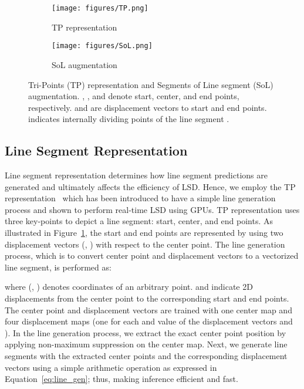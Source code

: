 \documentclass[letterpaper]{article} \usepackage{aaai22}  \usepackage{times}  \usepackage{helvet}  \usepackage{courier}  \usepackage[hyphens]{url}  \usepackage{graphicx} \urlstyle{rm} \def\UrlFont{\rm}  \usepackage{natbib}  \usepackage{caption} \DeclareCaptionStyle{ruled}{labelfont=normalfont,labelsep=colon,strut=off} \frenchspacing  \setlength{\pdfpagewidth}{8.5in}  \setlength{\pdfpageheight}{11in}  \usepackage{algorithm}
\begin{document}
\begin{figure}[t!]
    \centering
     \begin{subfigure}[b]{0.48\columnwidth}
        \centering\texttt{[image: figures/TP.png]}
         \caption{TP representation}
         \label{fig:tp}
     \end{subfigure}
    \begin{subfigure}[b]{0.48\columnwidth}
        \centering\texttt{[image: figures/SoL.png]}
         \caption{SoL augmentation}
         \label{fig:sol}
     \end{subfigure}
\caption{Tri-Points (TP) representation and Segments of Line segment (SoL) augmentation. , , and  denote start, center, and end points, respectively.  and  are displacement vectors to start and end points.  indicates internally dividing points of the line segment .}
\label{fig:line_representation}
\end{figure}

\subsection{Line Segment Representation}
Line segment representation determines how line segment predictions are generated and ultimately affects the efficiency of LSD.
Hence, we employ the TP representation~\cite{huang2020tp} which has been introduced to have a simple line generation process and shown to perform real-time LSD using GPUs.
TP representation uses three key-points to depict a line segment: start, center, and end points.
As illustrated in Figure~\ref{fig:tp}, the start  and end  points are represented by using two displacement vectors (, ) with respect to the center  point.
The line generation process, which is to convert center point and displacement vectors to a vectorized line segment, is performed as:

where (, ) denotes coordinates of an arbitrary  point.
 and  indicate 2D displacements from the center point  to the corresponding start  and end  points.
The center point and displacement vectors are trained with one center map and four displacement maps (one for each  and  value of the displacement vectors  and ).
In the line generation process, we extract the exact center point position by applying non-maximum suppression on the center map.
Next, we generate line segments with the extracted center points and the corresponding displacement vectors using a simple arithmetic operation as expressed in Equation~\ref{eq:line_gen}; thus, making inference efficient and fast.
\end{document}
